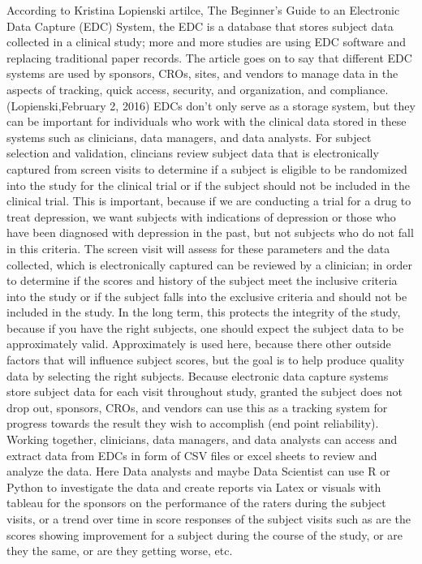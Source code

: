 \documentclass[sigconf]{acmart}
\begin{document}
According to Kristina Lopienski artilce, The Beginner’s Guide to an Electronic Data Capture (EDC) System, the EDC is a database that stores subject data collected in a clinical study; more and more studies are using EDC software and replacing traditional paper records. 
The article goes on to say that different EDC systems are used by sponsors, CROs, sites, and vendors to manage data in the aspects of tracking, quick access, security, and organization, and compliance. (Lopienski,February 2, 2016)
EDCs don't only serve as a storage system, but they can be important for individuals who work with the clinical data stored in these systems such as clinicians, data managers, and data analysts. For subject selection and validation, clincians review subject data that is electronically captured from screen visits to determine if a subject is eligible to be randomized into the study for the clinical trial or if the subject should not be included in the clinical trial. 
This is important, because if we are conducting a trial for a drug to treat depression, we want subjects with indications of depression or those who have been diagnosed with depression in the past, but not subjects who do not fall in this criteria. 
The screen visit will assess for these parameters and the data collected, which is electronically captured can be reviewed by a clinician;
in order to determine if the scores and history of the subject meet the inclusive criteria into the study or if the subject falls into the exclusive criteria and should not be included in the study. In the long term, this protects the integrity of the study, because if you have the right subjects, one should expect the subject data to be approximately valid. Approximately is used here, because there other outside factors that will influence subject scores, but the goal is to help produce quality data by selecting the right subjects.
Because electronic data capture systems store subject data for each visit throughout study, granted the subject does not drop out, sponsors, CROs, and vendors can use this as a tracking system for progress towards the result they wish to accomplish (end point reliability). 
Working together, clinicians, data managers, and data analysts can access and extract data from EDCs in form of CSV files or excel sheets to review and analyze the data.
Here Data analysts and maybe Data Scientist can use R or Python to investigate the data and create reports via Latex or visuals with tableau for the sponsors on the performance of the raters during the subject visits, or a trend over time in score responses of the subject visits such as are the scores showing improvement for a subject during the course of the study, or are they the same, or are they getting worse, etc. 
\end{document}
